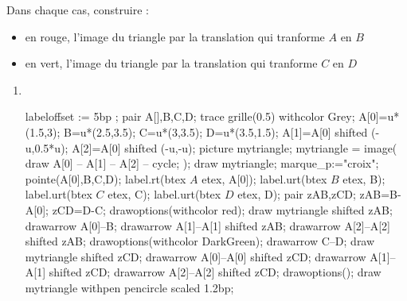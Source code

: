 \begin{corrige}
    Dans chaque cas, construire :
    \begin{itemize}
        \item en rouge, l'image du triangle par la translation qui tranforme $A$ en $B$
        \item en vert, l'image du triangle par la translation qui tranforme $C$ en $D$
    \end{itemize}
    \begin{changemargin}{-15mm}{0mm}
        \begin{multicols}{2}
            \begin{enumerate}
                \item \phantom{rrr}\\
                \begin{Geometrie}[CoinHD={(4u,4u)}]
                    labeloffset := 5bp ;
                    pair A[],B,C,D;                    
                    trace grille(0.5) withcolor Grey;
                    A[0]=u*(1.5,3);
                    B=u*(2.5,3.5);
                    C=u*(3,3.5);
                    D=u*(3.5,1.5);
                    A[1]=A[0] shifted (-u,0.5*u);
                    A[2]=A[0] shifted (-u,-u);
                    picture mytriangle;
                    mytriangle = image( 
                        draw A[0] -- A[1] -- A[2] -- cycle;
                    );
                    draw mytriangle;
                    marque_p:="croix";
                    pointe(A[0],B,C,D);
                    label.rt(btex $A$ etex, A[0]);
                    label.urt(btex $B$ etex, B);
                    label.urt(btex $C$ etex, C);
                    label.urt(btex $D$ etex, D);
                    pair zAB,zCD;
                    zAB=B-A[0];
                    zCD=D-C;
                    drawoptions(withcolor red);
                    draw mytriangle shifted zAB;
                    drawarrow A[0]--B;
                    drawarrow A[1]--A[1] shifted zAB;
                    drawarrow A[2]--A[2] shifted zAB;
                    drawoptions(withcolor DarkGreen);
                    drawarrow C--D;
                    draw mytriangle shifted zCD;
                    drawarrow A[0]--A[0] shifted zCD;
                    drawarrow A[1]--A[1] shifted zCD;
                    drawarrow A[2]--A[2] shifted zCD;
                    drawoptions();
                    draw mytriangle withpen pencircle scaled 1.2bp;

\end{Geometrie}
\end{enumerate}
\end{multicols}
\end{changemargin}
\end{corrige}
